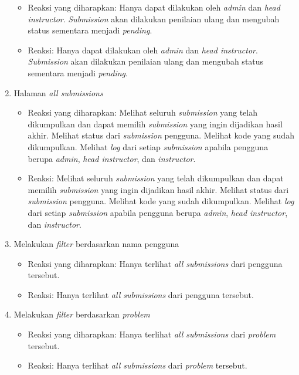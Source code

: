 \begin{enumerate}
	 \begin{itemize}
	 	\item Reaksi yang diharapkan: Hanya dapat dilakukan oleh \textit{admin} dan \textit{head instructor}. \textit{Submission} akan dilakukan penilaian ulang dan mengubah status sementara menjadi \textit{pending}.
	 	\item Reaksi: Hanya dapat dilakukan oleh \textit{admin} dan \textit{head instructor}. \textit{Submission} akan dilakukan penilaian ulang dan mengubah status sementara menjadi \textit{pending}.
	 \end{itemize}
	 \item Halaman \textit{all submissions}
	 \begin{itemize}
	 	\item Reaksi yang diharapkan: Melihat seluruh \textit{submission} yang telah dikumpulkan dan dapat memilih \textit{submission} yang ingin dijadikan hasil akhir. Melihat status dari \textit{submission} pengguna. Melihat kode yang sudah dikumpulkan. Melihat \textit{log} dari setiap \textit{submission} apabila pengguna berupa \textit{admin}, \textit{head instructor}, dan \textit{instructor}.
	 	\item Reaksi: Melihat seluruh \textit{submission} yang telah dikumpulkan dan dapat memilih \textit{submission} yang ingin dijadikan hasil akhir. Melihat status dari \textit{submission} pengguna. Melihat kode yang sudah dikumpulkan. Melihat \textit{log} dari setiap \textit{submission} apabila pengguna berupa \textit{admin}, \textit{head instructor}, dan \textit{instructor}.
	 \end{itemize}
	 \item Melakukan \textit{filter} berdasarkan nama pengguna
	 \begin{itemize}
	 	\item Reaksi yang diharapkan: Hanya terlihat \textit{all submissions} dari pengguna tersebut.
	 	\item Reaksi: Hanya terlihat \textit{all submissions} dari pengguna tersebut.
	 \end{itemize}
	 \item Melakukan \textit{filter} berdasarkan \textit{problem}
	 \begin{itemize}
	 	\item Reaksi yang diharapkan: Hanya terlihat \textit{all submissions} dari \textit{problem} tersebut.
	 	\item Reaksi: Hanya terlihat \textit{all submissions} dari \textit{problem} tersebut.
	 \end{itemize}

\end{enumerate}

